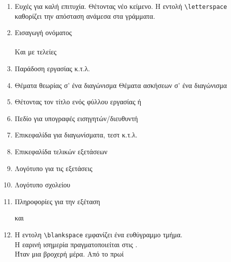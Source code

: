 \documentclass[12pt,a4page]{article}
\begin{document}
\begin{enumerate}
\item Ευχές για καλή επιτυχία.
  \wish
  Θέτοντας νέο κείμενο. Η εντολή \verb/\letterspace/ καθορίζει την απόσταση ανάμεσα στα γράμματα.
  \makeatletter
  \def\schl@wish{\letterspace{10} ΚΑΛΗ ΤΥΧΗ}
  \makeatother
  \wish
\item Εισαγωγή ονόματος\hspace{2em} \fullname\\
  \datefield \\
  Και με τελείες \hspace{3em} \fullname[10]\\ \datefield[10]
\item Παράδοση εργασίας κ.τ.λ. \hspace{3em} \\
\item Θέματα θεωρίας σ' ένα διαγώνισμα \theorypart
  Θέματα ασκήσεων σ' ένα διαγώνισμα \exercisepart
\item Θέτοντας τον τίτλο ενός φύλλου εργασίας
  \worksheettitle{}
  ή
\item Πεδίο για υπογραφές εισηγητών/διευθυντή\\
  \hfill
\item Επικεφαλίδα για διαγωνίσματα, τεστ κ.τ.λ.
  \examtitle{}
\item Επικεφαλίδα τελικών εξετάσεων
\item Λογότυπο για τις εξετάσεις
\item Λογότυπο σχολείου\\ \schoollogo{100pt}
\item Πληροφορίες για την εξέταση\\
  \hfill{}

  και

  \hfill\examdetailsii
\item Η εντολη \verb*/\blankspace/ εμφανίζει ένα ευθύγραμμο τμήμα. \\
  Η εαρινή ισημερία πραγματοποιείται στις \blankspace{10em}.\\
  Ήταν μια βροχερή μέρα. Από το πρωί \blankspace[-1ex]{3em}\\
  \\
\end{enumerate}
\end{document}
